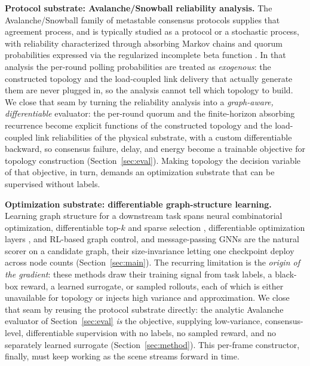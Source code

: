 \documentclass[journal]{IEEEtran}
\begin{document}
\textbf{Protocol substrate: Avalanche/Snowball reliability analysis.} The
Avalanche/Snowball family of metastable consensus protocols
\cite{PLACEHOLDER_avalanche_snowball} supplies that agreement process, and is
typically studied as a protocol or a stochastic process, with reliability
characterized through absorbing Markov chains \cite{PLACEHOLDER_absorbing_markov}
and quorum probabilities expressed via the regularized incomplete beta function
\cite{PLACEHOLDER_incomplete_beta}. In that analysis the per-round polling
probabilities are treated as \emph{exogenous}: the constructed topology and the
load-coupled link delivery that actually generate them are never plugged in, so
the analysis cannot tell which topology to build. We close that seam by turning
the reliability analysis into a \emph{graph-aware, differentiable} evaluator: the
per-round quorum and the finite-horizon absorbing recurrence become explicit
functions of the constructed topology and the load-coupled link reliabilities of
the physical substrate, with a custom differentiable backward, so consensus
failure, delay, and energy become a trainable objective for topology construction
(Section~\ref{sec:eval}). Making topology the decision variable of that objective,
in turn, demands an optimization substrate that can be supervised without labels.

\textbf{Optimization substrate: differentiable graph-structure learning.}
Learning graph structure for a downstream task spans neural combinatorial
optimization, differentiable top-$k$ and sparse selection
\cite{PLACEHOLDER_gumbel_softmax,PLACEHOLDER_differentiable_topk}, differentiable
optimization layers \cite{PLACEHOLDER_diff_optimization}, and RL-based graph
control, and message-passing GNNs
\cite{PLACEHOLDER_message_passing,PLACEHOLDER_gnn_graphconstruction} are the
natural scorer on a candidate graph, their size-invariance
\cite{PLACEHOLDER_graphsage_inductive} letting one checkpoint deploy across node
counts (Section~\ref{sec:main}). The recurring limitation is the \emph{origin of
the gradient}: these methods draw their training signal from task labels, a
black-box reward, a learned surrogate, or sampled rollouts, each of which is
either unavailable for topology or injects high variance and approximation. We
close that seam by reusing the protocol substrate directly: the analytic
Avalanche evaluator of Section~\ref{sec:eval} \emph{is} the objective, supplying
low-variance, consensus-level, differentiable supervision with no labels, no
sampled reward, and no separately learned surrogate
(Section~\ref{sec:method}). This per-frame constructor, finally, must keep
working as the scene streams forward in time.
\end{document}
